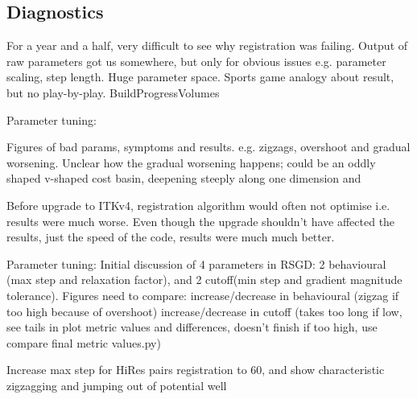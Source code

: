     \subsection{Diagnostics} %
    \label{sub:diagnostics}
    
      For a year and a half, very difficult to see why registration was failing. Output of raw parameters got us somewhere, but only for obvious issues e.g. parameter scaling, step length. Huge parameter space. Sports game analogy about result, but no play-by-play. BuildProgressVolumes
      
      Parameter tuning:
      
      Figures of bad params, symptoms and results. e.g. zigzags, overshoot and gradual worsening. Unclear how the gradual worsening happens; could be an oddly shaped v-shaped cost basin, deepening steeply along one dimension and 
      
      Before upgrade to ITKv4, registration algorithm would often not optimise i.e. results were much worse. Even though the upgrade shouldn't have affected the results, just the speed of the code, results were much much better.
      
      Parameter tuning:
      Initial discussion of 4 parameters in RSGD: 2 behavioural (max step and relaxation factor), and 2 cutoff(min step and gradient magnitude tolerance).
      Figures need to compare:
        increase/decrease in behavioural (zigzag if too high because of overshoot)
      increase/decrease in cutoff (takes too long if low, see tails in plot metric values and differences, doesn't finish if too high, use compare final metric values.py)

      Increase max step for HiRes pairs registration to 60, and show characteristic zigzagging and jumping out of potential well
      
